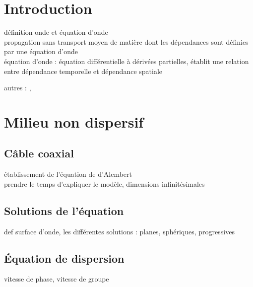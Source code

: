 


\biblio{}

\section*{Introduction}
définition onde et équation d'onde \\
propagation sans transport moyen de matière dont les dépendances sont définies par une équation d'onde \\
équation d'onde : équation différentielle à dérivées partielles, établit une relation entre dépendance temporelle et dépendance spatiale  \\

autres : \cite{olivier_ondes}, \cite{guyon_hydrodynamique}

\section{Milieu non dispersif}
\subsection{Câble coaxial}
établissement de l'équation de d'Alembert \\
prendre le temps d'expliquer le modèle, dimensions infinitésimales \\

\subsection{Solutions de l'équation}
def surface d'onde, les différentes solutions : planes, sphériques, progressives \\
\subsection{Équation de dispersion}
vitesse de phase, vitesse de groupe \\


